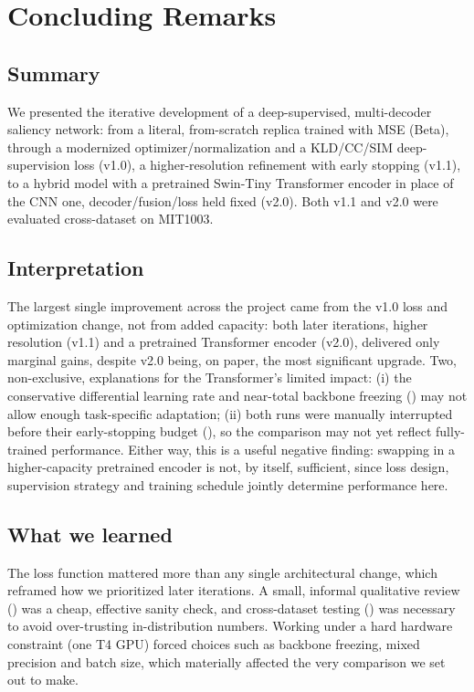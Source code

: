 
\section{Concluding Remarks}
\label{sec:conclusions}

\subsection{Summary}
We presented the iterative development of a deep-supervised, multi-decoder saliency network: from a literal, from-scratch replica trained with MSE (Beta), through a modernized optimizer/normalization and a KLD/CC/SIM deep-supervision loss (v1.0), a higher-resolution refinement with early stopping (v1.1), to a hybrid model with a pretrained Swin-Tiny Transformer encoder in place of the CNN one, decoder/fusion/loss held fixed (v2.0). Both v1.1 and v2.0 were evaluated cross-dataset on MIT1003.

\subsection{Interpretation}
The largest single improvement across the project came from the v1.0 loss and optimization change, not from added capacity: both later iterations, higher resolution (v1.1) and a pretrained Transformer encoder (v2.0), delivered only marginal gains, despite v2.0 being, on paper, the most significant upgrade. Two, non-exclusive, explanations for the Transformer's limited impact: (i) the conservative differential learning rate and near-total backbone freezing () may not allow enough task-specific adaptation; (ii) both runs were manually interrupted before their early-stopping budget (), so the comparison may not yet reflect fully-trained performance. Either way, this is a useful negative finding: swapping in a higher-capacity pretrained encoder is not, by itself, sufficient, since loss design, supervision strategy and training schedule jointly determine performance here.

\subsection{What we learned}
The loss function mattered more than any single architectural change, which reframed how we prioritized later iterations. A small, informal qualitative review () was a cheap, effective sanity check, and cross-dataset testing () was necessary to avoid over-trusting in-distribution numbers. Working under a hard hardware constraint (one T4 GPU) forced choices such as backbone freezing, mixed precision and batch size, which materially affected the very comparison we set out to make.

